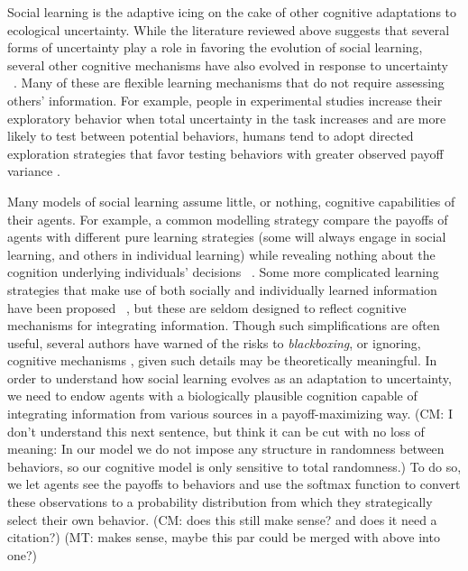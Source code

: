 \documentclass[letterpaper,11.5pt]{scrartcl}
\newcommand{\mt}[1]{{\textcolor{myorange} {({\tiny MT:} #1)}}}
\newcommand{\cm}[1]{{\textcolor{mypurple} {({\tiny CM:} #1)}}}
\begin{document}
Social learning is the adaptive icing on the cake of other cognitive adaptations
to ecological uncertainty.  While the literature reviewed above suggests that
several forms of uncertainty play a role in favoring the evolution of social
learning, several other cognitive mechanisms have also evolved in response to
uncertainty ~\cite{volz2012}. Many of these are flexible learning mechanisms that
do not require assessing others' information. For example, people in experimental
studies increase their exploratory behavior when total uncertainty in the task
increases and are more likely to test %
between potential behaviors, humans tend to adopt directed exploration strategies
that favor testing behaviors with greater observed payoff variance
\cite{Wilson2014,Gershman2019}.

Many models of social learning assume little, or nothing, cognitive capabilities
of their agents. For example, a common modelling strategy compare the payoffs of
agents with different pure learning strategies (some will always engage in social
learning, and others in individual learning) while revealing nothing about the
cognition underlying individuals' decisions  ~\cite{BoydRicherson1985, Rogers1988,
aoki2005}. Some more complicated learning strategies that make use of both
socially and individually learned information have been proposed
~\cite{Enquist2007, perreault2012bayesian}, but these are seldom designed to
reflect cognitive mechanisms for integrating information. Though such
simplifications are often useful, several authors have warned of the risks to
\emph{blackboxing}, or ignoring, cognitive mechanisms \cite[p. 658]{Heyes2016,
Kendal2018}, given such details may be theoretically meaningful. In order to
understand how social learning evolves as an adaptation to uncertainty, we need to
endow agents with a  biologically plausible cognition capable of integrating
information from various sources in a payoff-maximizing way. \cm{I don't
  understand this next sentence, but think it can be cut with no loss of meaning:
  In our model we do not impose any structure in randomness between behaviors, so
our cognitive model is only sensitive to total randomness.} To do so, we let
agents see the payoffs to behaviors and use the softmax function to convert these
observations to a probability distribution from which they strategically select
their own behavior. \cm{does this still make sense? and does it need a citation?} \mt{makes sense, maybe this par could be merged with above into one?}
\end{document}
